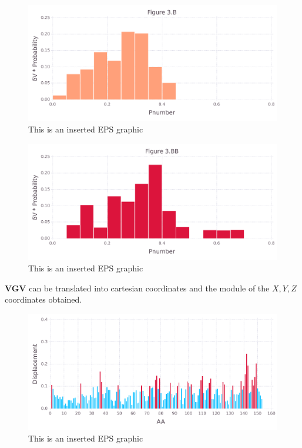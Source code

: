 \documentclass[10pt,letterpaper]{article}
\begin{document}
\begin{figure}[ht]
\begin{center}
\includegraphics[scale=0.5]{256l/3bfigure_very_hi-precision.pdf}
\caption{This is an inserted EPS graphic}
\label{fig10}
\end{center}
\end{figure}

\begin{figure}[ht]
\begin{center}
\includegraphics[scale=0.5]{256l/3bbfigure_very_hi-precision.pdf}
\caption{This is an inserted EPS graphic}
\label{fig11}
\end{center}
\end{figure}

\FloatBarrier


\textbf{VGV} can be translated into cartesian coordinates and the module of the \(X, Y, Z\) coordinates obtained.

\begin{figure}[ht]
\begin{center}
\includegraphics[scale=0.5]{256l/5figure_very_hi-precision.pdf}
\caption{This is an inserted EPS graphic}
\label{fig13}
\end{center}
\end{figure}
              
\end{document}
